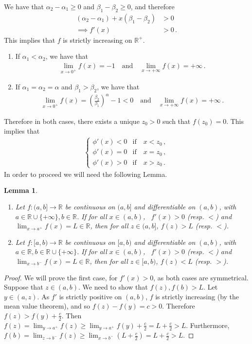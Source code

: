 \documentclass{article}
\newcommand{\R}{\mathbb{R}}
\newtheorem{lemma}[theorem]{Lemma}
\begin{document}
%
We have that $\alpha_2 - \alpha_1 \geq 0$ and
$\beta_1 - \beta_2 \geq 0$, and therefore
%
\begin{align*}
	(\alpha_2 - \alpha_1) + x(\beta_1 - \beta_2) &> 0\\
	\implies f'(x) & > 0 \,.
\end{align*}
%
This implies that $f$ is strictly increasing on $\R^+$.
%
\begin{enumerate}
	\item If $\alpha_1 < \alpha_2$, we have that
		\begin{align*}
			\lim_{x \to 0^+} f(x) = -1 \quad \text{and} \quad
				\lim_{x \to +\infty} f(x) = +\infty\,.
		\end{align*}
	\item If $\alpha_1 = \alpha_2 = \alpha$ and $\beta_1 > \beta_2$,
		we have that
		\begin{align*}
			\lim_{x \to 0^+} f(x)
				= \left(\frac{\beta_2}{\beta_1}\right) ^ \alpha - 1 < 0 \quad
				\text{and} \quad \lim_{x \to +\infty} f(x) = +\infty \,.
		\end{align*}
\end{enumerate}
%
Therefore in both cases, there exists a unique $z_0 > 0$
such that $f(z_0) = 0$. This implies that
%
\begin{align*}
	\begin{cases}
		\phi'(x) < 0 &\text{if} \quad x < z_0 \,,\\
		\phi'(x) = 0 &\text{if} \quad x = z_0 \,,\\
		\phi'(x) > 0 &\text{if} \quad x > z_0 \,.
	\end{cases}
\end{align*}
%
In order to proceed we will need the following Lemma.
%
\begin{lemma}
	\begin{enumerate}
		\item Let $f \colon (a, b] \to \R$ be continuous on $(a, b]$
			and differentiable on $(a, b)$, with 
			$a \in \R \cup \{+\infty\}, b \in \R$. If for all $x \in (a, b)$,
			\ $f'(x) > 0$ (resp. $<$) and $\lim_{x \to a^+} f(x) = L \in \R$,
			then for all $z \in (a, b]$, $f(z) > L$ (resp. $<$).
		\item Let $f \colon [a, b) \to \R$ be continuous on $[a, b)$
			and differentiable on $(a, b)$, with
			$a \in \R, b \in \R \cup \{+\infty\}$. If for all $x\in(a, b)$,
			\ $f'(x) > 0$ (resp. $<$) and $\lim_{x \to b^-} f(x) = L \in \R$,
			then for all $z \in [a, b)$, $f(z) < L$ (resp. $>$).
	\end{enumerate}
	\label{limit}
\end{lemma}
%
\begin{proof}
	We will prove the first case, for $f'(x) > 0$,
	as both cases are symmetrical. Suppose that $z \in (a, b)$.
	We need to show that $f(z),f(b) > L$. Let $y \in (a, z)$.
	As $f'$ is strictly positive on $(a, b)$, $f$ is strictly increasing
	(by the mean value theorem), and so $f(z) - f(y) = c > 0$.
	Therefore $f(z) > f(y) + \frac{c}{2}$.
	Then $f(z) = \lim_{y \to a^+} f(z) \geq \lim_{y \to a^+} f(y)
	+ \frac{c}{2} = L + \frac{c}{2} > L$.
	Furthermore, $f(b) = \lim_{z \to b^-} f(z) \geq \lim_{x \to b^-} 
	(L + \frac{c}{2}) = L + \frac{c}{2} > L$.
\end{proof}
%
\end{document}
